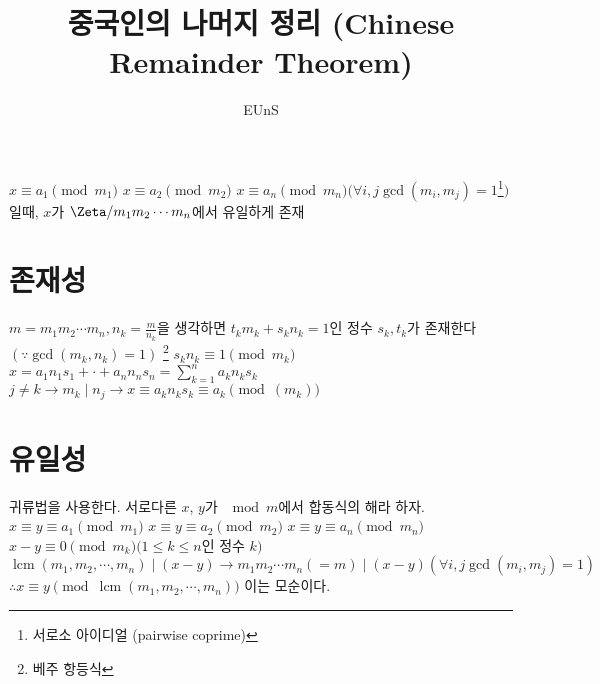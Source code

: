 \documentclass{oblivoir}
\begin{document}
\par
\title{중국인의 나머지 정리 (Chinese Remainder Theorem)}
\author{ EUnS }
\maketitle
$x \equiv a_1 \pmod{m_1}$
$x \equiv a_2 \pmod{m_2}$
$x \equiv a_n \pmod{m_n} ( \forall i,j \gcd(m_{i} ,m_{j}) = 1$\footnote{서로소 아이디얼 (pairwise coprime)}$)$
일때, $x$가 $\Zeta / m_{1}m_{2} \cdots m_{n}$에서 유일하게 존재
\chapter{존재성}
$m = m_{1}m_{2} \cdots m_{n}, n_{k} = \frac{m}{n_k}$을 생각하면 
$t_{k}m_{k}+s_{k}n_{k} = 1$인 정수 $s_{k} ,t_{k}$가 존재한다 $( \because \gcd( m_{k}, n_{k}) = 1 )$ \footnote{베주 항등식}
$s_{k}n_{k} \equiv 1 \pmod{m_k}$
$x=a_{1}n_{1}s_{1} + \cdot + a_{n}n_{n}s_{n} = \sum_{k=1}^n a_{k}n_{k}s_{k}$
$j \ne k \longrightarrow m_{k} \mid n_{j} \longrightarrow x \equiv a_{k}n_{k}s_{k} \equiv a_{k} \pmod(m_{k})$
\chapter{유일성}
귀류법을 사용한다.
서로다른 $x$, $y$가 $\mod m$에서 합동식의 해라 하자.
$x \equiv y\equiv a_1 \pmod{m_1}$
$x \equiv y\equiv a_2 \pmod{m_2}$
$x \equiv y\equiv a_n \pmod{m_n}$
$x - y \equiv 0 \pmod{m_k} ( 1\le k \le n$인 정수 $k )$
$\operatorname{lcm}(m_1, m_2, \cdots, m_n) \mid (x-y) \longrightarrow m_{1} m_{2} \cdots m_{n}( = m ) \mid (x-y) (\forall i,j \gcd(m_{i} ,m_{j}) = 1)$
$\therefore x \equiv y \pmod{\operatorname{lcm}(m_1, m_2, \cdots, m_n)}$
이는 모순이다.
\end{document}
